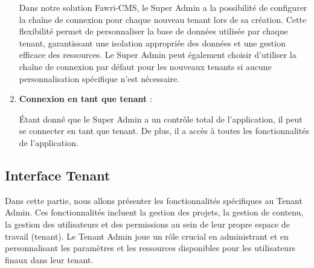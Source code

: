 \begin{enumerate}
          \hspace{\parindent}Dans notre solution Fawri-CMS, le Super Admin a la possibilité de configurer la chaîne de connexion pour chaque nouveau tenant lors de sa création. Cette flexibilité permet de personnaliser la base de données utilisée par chaque tenant, garantissant une isolation appropriée des données et une gestion efficace des ressources. Le Super Admin peut également choisir d'utiliser la chaîne de connexion par défaut pour les nouveaux tenants si aucune personnalisation spécifique n'est nécessaire.



    \item \textbf{Connexion en tant que tenant} :

          Étant donné que le Super Admin a un contrôle total de l'application, il peut se connecter en tant que tenant. De plus, il a accès à toutes les fonctionnalités de l'application.




\end{enumerate}


\subsection{Interface Tenant}

Dans cette partie, nous allons présenter les fonctionnalités spécifiques au Tenant Admin. Ces fonctionnalités incluent la gestion des projets, la gestion de contenu, la gestion des utilisateurs et des permissions au sein de leur propre espace de travail (tenant). Le Tenant Admin joue un rôle crucial en administrant et en personnalisant les paramètres et les ressources disponibles pour les utilisateurs finaux dans leur tenant.




